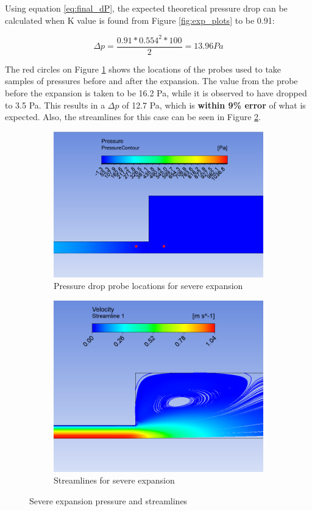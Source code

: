 Using equation \ref{eq:final_dP}, the expected theoretical pressure drop can be calculated when K value is found from Figure \ref{fig:exp_plots} to be 0.91:

\[\Delta p = \frac{0.91 * 0.554^2 * 100}{2} = 13.96Pa \]


\noindent The red circles on Figure \ref{fig:02_locs} shows the locations of the probes used to take samples of pressures before and after the expansion. The value from the probe before the expansion is taken to be 16.2 Pa, while it is observed to have dropped to 3.5 Pa. This results in a $\Delta p$ of 12.7 Pa, which is \textbf{within 9\% error} of what is expected. Also, the streamlines for this case can be seen in Figure \ref{fig:02_stream}.


\begin{figure}[H]
\centering
\hfill
\begin{subfigure}{.48\textwidth}
    \includegraphics[width=.95\linewidth]{images/task3/02_locations.png}
    \caption{Pressure drop probe locations for severe expansion}
    \label{fig:02_locs}
\end{subfigure}
\hfill
\begin{subfigure}{.48\textwidth}
    \includegraphics[width=.95\linewidth]{images/task3/02_streamlines.png}
    \caption{Streamlines for severe expansion}
    \label{fig:02_stream}
\end{subfigure}
\label{fig:02_figure}
\caption{Severe expansion pressure and streamlines}
\end{figure}


